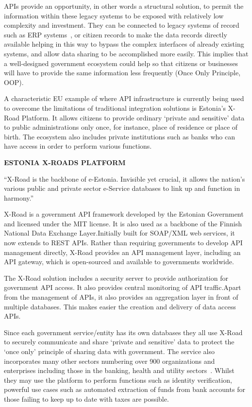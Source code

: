 APIs provide an opportunity, in other words a structural solution, to permit the
information within these legacy systems to be exposed with relatively low complexity
and investment. They can be connected to legacy systems of record such as ERP
systems~\citep{erp_integration}, or citizen records to make the data records directly available
helping in this way to bypass the complex interfaces of already existing systems,
and allow data sharing to be accomplished more easily. This implies that a
well-designed government ecosystem could help so that citizens or businesses will have to
provide the same information less frequently (Once Only Principle, OOP).

A characteristic EU example of where API infrastructure is currently being used to overcome
the limitations of traditional integration solutions is Estonia’s X-Road Platform.
It allows citizens to provide ordinary ‘private and sensitive’ data to public administrations only once, for instance, place of residence or place of birth. The ecosystem also includes
private institutions such as banks who can have access in order to perform various
functions.

\textbf{ESTONIA X-ROADS PLATFORM}

“X-Road is the backbone of e-Estonia. Invisible yet crucial, it allows the
nation’s various public and private sector e-Service databases to link up and
function in harmony.”~\citep{x-road}

X-Road is a government API framework developed by the Estonian Government
and licensed under the MIT license. It is also used as a backbone of the Finnish
National Data Exchange Layer.Initially built for SOAP/XML web services, it now
extends to REST APIs. Rather than requiring governments to develop API management
directly, X-Road provides an API management layer, including an API gateway,
which is open-sourced and available to governments worldwide.~\citep{gov_transformation}

The X-Road solution includes a security server to provide authorization
for government API access. It also provides central monitoring of
API traffic.Apart from the management of APIs, it also provides an
aggregation layer in front of multiple databases. This makes easier the creation
and delivery of data access APIs.

Since each government service/entity has its own databases they all use X-Road
to securely communicate and share ‘private and sensitive’ data to protect the
‘once only’ principle of sharing data with government. The service also incorporates
many other sectors numbering over 900 organizations and enterprises including those
in the banking, health and utility sectors~\cite{x-road}. Whilst they may use the platform to
perform functions such as identity verification, powerful use cases such as automated extraction of funds from bank accounts for those failing to keep up to date with
taxes are possible.

